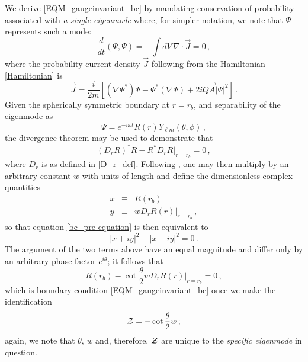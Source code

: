 \documentclass[pra,twocolumn,nofootinbib, superscriptaddress]{revtex4}%
\def\({\left(}
\def\){\right)}
\def\[{\left[}
\def\]{\right]}
\def\f#1#2{\frac{#1}{#2}}
\def\del{\nabla}
\def\o{\omega}
\def\th{\theta}
\def\ph{\phi}
\providecommand{\abs}[1]{\left\lvert#1\right\rvert}
\begin{document}
We derive \eqref{EQM_gaugeinvariant_bc} by mandating conservation of probability associated with \emph{a single eigenmode} where, for simpler notation, we note that $\Psi$ represents such a mode:
\begin{equation}\label{nondecaying_unitary_condition}
\f{d}{dt} (\Psi,\Psi) =-\int dV\,\del\cdot \vec{J} =0 \,,
\end{equation}
where the probability current density $\vec{J}$ following from the Hamiltonian \eqref{Hamiltonian} is
\begin{equation}\label{prob_curr_density}
\vec{J} = \f{i}{2m}\[\(\del \Psi^*\)\Psi- \Psi^* \(\del \Psi\) + 2iQ\vec{A} \abs{\Psi}^2\]\,.
\end{equation}
Given the spherically symmetric boundary at $r=r_b$, and separability of the eigenmode as
\begin{equation}\label{nondecaying_eigenmode}
\Psi=e^{-i\o t }R\(r\) Y_{\ell m}\(\th,\ph\)\,,
\end{equation}
the divergence theorem may be used to demonstrate that
\begin{equation}\label{bc_pre-equation}
\(D_r R\)^*R-R^* D_r R\bigg|_{r=r_b}=0\,,
\end{equation}
where $D_r$ is as defined in \eqref{D_r_def}. Following \cite{Bonneau:1999zq}, one may then multiply by an arbitrary constant $w$ with units of length and define the dimensionless complex quantities
\begin{eqnarray}\label{x_and_y_defs}
x&\equiv& R(r_b)\\
y&\equiv& wD_r R(r)|_{r=r_b}\,,
\end{eqnarray}
so that equation \eqref{bc_pre-equation} is then equivalent to 
\begin{equation}
\abs{x+iy}^2-\abs{x-iy}^2=0\,.
\end{equation}
The argument of the two terms above have an equal magnitude and differ only by an arbitrary phase factor $e^{i\th}$; it follows that
\begin{equation}
R(r_b)-\cot{\f{\th}{2}}w D_r R(r)\bigg|_{r=r_b}=0\,,
\end{equation}
which is boundary condition \eqref{EQM_gaugeinvariant_bc} once we make the identification
\begin{equation}\label{realZdef}
{\cal Z}=-\cot{\f{\th}{2}}w\,;
\end{equation}
again, we note that $\th$, $w$ and, therefore, ${\cal Z}$ are unique to the \emph{specific eigenmode} in question. 
\end{document}
